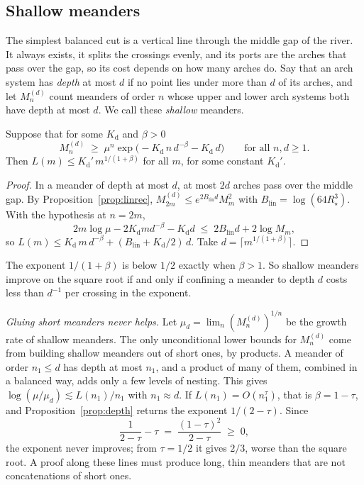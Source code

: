 \subsection{Shallow meanders}

The simplest balanced cut is a vertical line through the middle gap of the river. It always exists,
it splits the crossings evenly, and its ports are the arches that pass over the gap, so its cost
depends on how many arches do. Say that an arch system has \emph{depth} at most $d$ if no point lies
under more than $d$ of its arches, and let $M^{(d)}_n$ count meanders of order $n$ whose upper and
lower arch systems both have depth at most $d$. We call these \emph{shallow} meanders.

\begin{proposition}\label{prop:depth}
Suppose that for some $K_{\mathrm d}$ and $\beta>0$
\[ M^{(d)}_n\;\ge\;\mu^n\exp\!\big(-K_{\mathrm d}\,n\,d^{-\beta}-K_{\mathrm d}\,d\big)\qquad\text{for all }n,d\ge1 .\]
Then $L(m)\le K_{\mathrm d}'\,m^{1/(1+\beta)}$ for all $m$, for some constant $K_{\mathrm d}'$.
\end{proposition}

\begin{proof}
In a meander of depth at most $d$, at most $2d$ arches pass over the middle gap. By
Proposition~\ref{prop:linrec}, $M^{(d)}_{2m}\le e^{2B_{\mathrm{lin}}d}M_m^2$ with $B_{\mathrm{lin}}=\log(64R_\star^3)$.
With the hypothesis at $n=2m$,
\[ 2m\log\mu-2K_{\mathrm d}md^{-\beta}-K_{\mathrm d}d\;\le\;2B_{\mathrm{lin}}d+2\log M_m , \]
so $L(m)\le K_{\mathrm d}\,m\,d^{-\beta}+(B_{\mathrm{lin}}+K_{\mathrm d}/2)\,d$.
Take $d=\lceil m^{1/(1+\beta)}\rceil$.
\end{proof}

The exponent $1/(1+\beta)$ is below $1/2$ exactly when $\beta>1$. So shallow meanders improve on the
square root if and only if confining a meander to depth $d$ costs less than $d^{-1}$ per crossing in
the exponent.

\emph{Gluing short meanders never helps.} Let $\mu_d=\lim_n(M^{(d)}_n)^{1/n}$ be the growth rate of
shallow meanders. The only unconditional lower bounds for $M^{(d)}_n$ come from building shallow
meanders out of short ones, by products. A meander of order $n_1\le d$ has depth at most $n_1$, and a
product of many of them, combined in a balanced way, adds only a few levels of nesting. This gives
$\log(\mu/\mu_d)\lesssim L(n_1)/n_1$ with $n_1\approx d$. If $L(n_1)=O(n_1^{\tau})$, that is $\beta=1-\tau$, and Proposition~\ref{prop:depth} returns the exponent
$1/(2-\tau)$. Since
\[ \frac1{2-\tau}-\tau\;=\;\frac{(1-\tau)^2}{2-\tau}\;\ge\;0, \]
the exponent never improves; from $\tau=1/2$ it gives $2/3$, worse than the square root. A proof along
these lines must produce long, thin meanders that are not concatenations of short ones.

